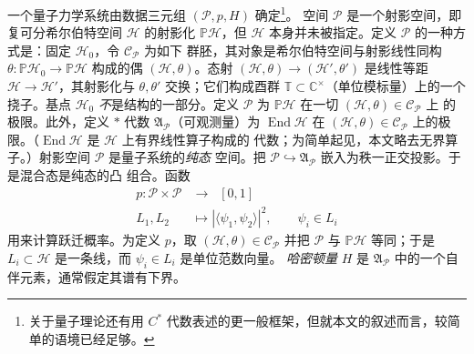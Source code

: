 \documentclass[11pt]{amsart}
\theoremstyle{definition}
\theoremstyle{remark}
\theoremstyle{plain}
\numberwithin{equation}{section}
\renewcommand{\:}{\colon}
\newcommand{\CC}{{\mathbb C}}
\DeclareMathOperator{\End}{End}
\newcommand{\PP}{{\mathbb P}}
\newcommand{\TT}{\mathbb T}
\newcommand{\ZZ}{{\mathbb Z}}
\newcommand{\zmod}[1]{\ZZ/#1\ZZ}
\newcommand{\zt}{\zmod2}
\newcommand{\AP}{\ssA_{\sP}}
\newcommand{\PH}{\PP\sH}
\newcommand{\cP}{\sC_{\sP}}
\newcommand{\sC}{\mathscr{C}}
\newcommand{\sH}{\mathscr{H}}
\newcommand{\sP}{\mathscr{P}}
\newcommand{\ssA}{\mathfrak{A}}
\begin{document}

一个量子力学系统由数据三元组 $(\sP,p,H)$ 确定\footnote{关于量子理论还有用
$C^*$ 代数表述的更一般框架，但就本文的叙述而言，较简单的语境已经足够。}。
空间 $\sP$ 是一个射影空间，即复可分希尔伯特空间 $\sH$ 的射影化 $\PH$，但
$\sH$ 本身并未被指定。定义 $\sP$ 的一种方式是：固定 $\sH_0$，令 $\cP$ 为如下
群胚，其对象是希尔伯特空间与射影线性同构 $\theta \:\PH_0\to \PH$ 构成的偶
$(\sH,\theta )$。态射 $(\sH,\theta )\to (\sH',\theta ')$ 是线性等距
$\sH\to \sH'$，其射影化与 $\theta ,\theta '$ 交换；它们构成酉群
$\TT\subset \CC^{\times }$（单位模标量）上的一个挠子。基点 $\sH_0$
\emph{不}是结构的一部分。定义 $\sP$ 为 $\PH$ 在一切 $(\sH,\theta )\in \cP$ 上
的极限。此外，定义 $*$ 代数 $\AP$（可观测量）为 $\End\sH$ 在
$(\sH,\theta )\in \cP$ 上的极限。（$\End\sH$ 是 $\sH$ 上有界线性算子构成的
代数；为简单起见，本文略去无界算子。）射影空间 $\sP$ 是量子系统的\emph{纯态}
空间。把 $\sP\hookrightarrow \AP$ 嵌入为秩一正交投影。于是混合态是纯态的凸
组合。函数
  \begin{equation}\label{eq:112}
     \begin{aligned} p\:\sP\times \sP&\longrightarrow \;\;[0,1] \\
      L_1,L_2&\longmapsto |\langle \psi _1,\psi _2
     \rangle|^2,\qquad \psi _i\in L_i\end{aligned}  
  \end{equation}
用来计算跃迁概率。为定义 $p$，取 $(\sH,\theta )\in \cP$ 并把 $\sP$ 与 $\PH$
等同；于是 $L_i\subset \sH$ 是一条线，而 $\psi _i\in L_i$ 是单位范数向量。
\emph{哈密顿量} $H$ 是 $\AP$ 中的一个自伴元素，通常假定其谱有下界。


\end{document}
